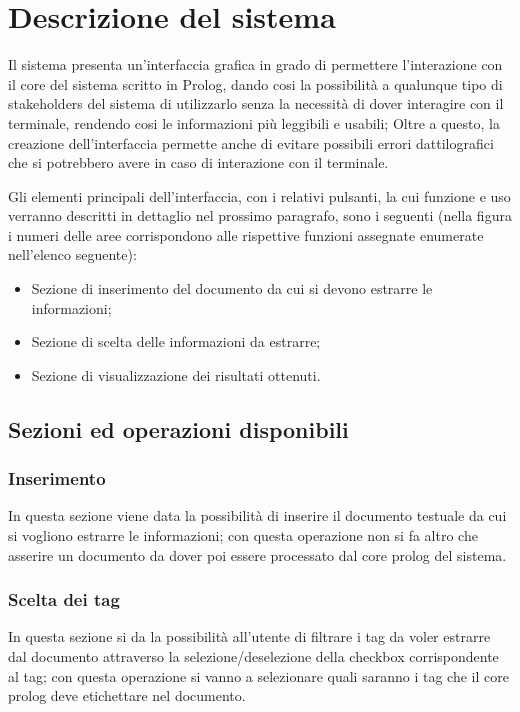 \section{Descrizione del sistema}

Il sistema presenta un'interfaccia grafica in grado di permettere l'interazione con il core del sistema scritto in Prolog, dando cosi la possibilità a qualunque tipo di stakeholders del sistema di utilizzarlo senza la necessità di dover interagire con il terminale, rendendo cosi le informazioni più leggibili e usabili; Oltre a questo, la creazione dell'interfaccia permette anche di evitare possibili errori dattilografici che si potrebbero avere in caso di interazione con il terminale.

Gli elementi principali dell’interfaccia, con i relativi pulsanti, la cui funzione e uso verranno descritti in dettaglio nel prossimo paragrafo, sono i seguenti (nella figura %
i numeri delle aree corrispondono alle rispettive funzioni assegnate enumerate
nell’elenco seguente):
\begin{itemize}
  \item Sezione di inserimento del documento da cui si devono estrarre le informazioni;
  \item Sezione di scelta delle informazioni da estrarre;
  \item Sezione di visualizzazione dei risultati ottenuti.
\end{itemize}
\subsection{Sezioni ed operazioni disponibili}
    \subsubsection{Inserimento}
    \label{Inserimento}
    In questa sezione viene data la possibilità di inserire il documento testuale da cui si vogliono estrarre le informazioni; con questa operazione non si fa altro che asserire un documento da dover poi essere processato dal core prolog del sistema.
    \subsubsection{Scelta dei tag}
    \label{ChoiceTag}
    In questa sezione si da la possibilità all'utente di filtrare i tag da voler estrarre dal documento attraverso la selezione/deselezione della checkbox corrispondente al tag; con questa operazione si vanno a selezionare quali saranno i tag che il core prolog deve etichettare nel documento.
